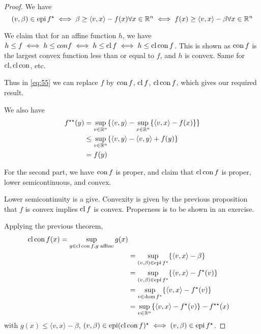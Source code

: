 \begin{proof}
  We have
  \begin{equation}
    \label{eq:55}
    (v, \beta) \in \operatorname*{epi} f^{\star} \iff \beta \geq \langle v, x
    \rangle - f(x) \forall x \in \mathbb{R}^{n} \iff f(x) \geq \langle v, x
    \rangle - \beta \forall x \in \mathbb{R}^{n}
  \end{equation}

  We claim that for an affine function $h$, we have $h \leq f \iff h
  \leq con f \iff h \leq \operatorname*{cl} f \iff h \leq \operatorname*{cl} \operatorname*{con} f$. This is shown
  as $\operatorname*{con} f$ is the largest convex function less than or equal to
  $f$, and $h$ is convex. Same for $\operatorname*{cl}, \operatorname*{cl} \operatorname*{con}$, etc.

  Thus in \eqref{eq:55} we can replace $f$ by $\operatorname*{con} f$, $\operatorname*{cl} f$, $\operatorname*{cl}
  \operatorname*{con} f$, which gives our required result.

  We also have
  \begin{align}
    \label{eq:56}
    f^{\star \star}(y) & = \sup_{v \in \mathbb{R}^{n}} \{ \langle v, y \rangle - \sup_{x \in \mathbb{R}^{n}}  \{ \langle v, x \rangle - f(x) \} \} \\
                       & \leq \sup_{v \in \mathbb{R}^{n}} \{ \langle v, y \rangle - \langle v, y  \rangle + f(y) \} \\
                       & = f(y)
 \end{align}
                     
  
  For the second part, we have $\operatorname*{con} f$ is proper, and claim that $\operatorname*{cl}
  \operatorname*{con} f$ is proper, lower semicontinuous, and convex.

  Lower semicontinuity is a give.  Convexity is given by the previous
  proposition that $f$ is convex implies $\operatorname*{cl} f$ is convex.
  Properness is to be shown in an exercise.

  Applying the previous theorem,
  \begin{align}
    \label{eq:57}
    \operatorname*{cl} \operatorname*{con} f(x) = \sup_{g \in \operatorname*{cl} \operatorname*{con} f, \text{$g$ affine}} g(x) \\
    &= \sup_{(v, \beta) \in \operatorname*{epi} f^{\star}} \{ \langle v, x \rangle - \beta \}
  \\
    &= \sup_{(v, \beta) \in \operatorname*{epi} f^{\star}} \{ \langle v, x \rangle -
    f^{\star}(v) \} \\
    &= \sup_{v \in \operatorname*{dom} f^{\star}} \{ \langle v, x \rangle -
    f^{\star}(v) \} \\
    &= \sup_{v \in \mathbb{R}^{n}} \{ \langle v, x \rangle - f^{\star}(v) \} -
    f^{\star \star}(x)
  \end{align}
  with $g(x) \leq \langle v, x \rangle - \beta$, $(v, \beta) \in \operatorname*{epi} (\operatorname*{cl} \operatorname*{con} f)^{\star} \iff (v, \beta) \in \operatorname*{epi} f^{\star}$.


\end{proof}

